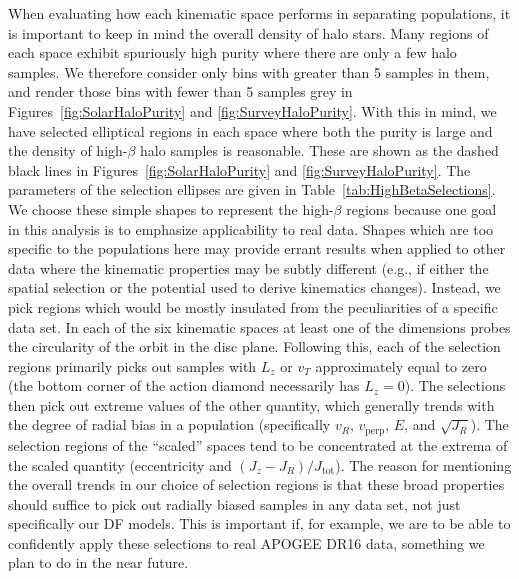 When evaluating how each kinematic space performs in separating populations, it is important to keep in mind the overall density of halo stars. Many regions of each space exhibit spuriously high purity where there are only a few halo samples. We therefore consider only bins with greater than 5 samples in them, and render those bins with fewer than 5 samples grey in Figures~\ref{fig:SolarHaloPurity} and \ref{fig:SurveyHaloPurity}. With this in mind, we have selected elliptical regions in each space where both the purity is large and the density of high-$\beta$ halo samples is reasonable. These are shown as the dashed black lines in Figures~\ref{fig:SolarHaloPurity} and \ref{fig:SurveyHaloPurity}. The parameters of the selection ellipses are given in Table~\ref{tab:HighBetaSelections}. We choose these simple shapes to represent the high-$\beta$ regions because one goal in this analysis is to emphasize applicability to real data. Shapes which are too specific to the populations here may provide errant results when applied to other data where the kinematic properties may be subtly different (e.g., if either the spatial selection or the potential used to derive kinematics changes). Instead, we pick regions which would be mostly insulated from the peculiarities of a specific data set. In each of the six kinematic spaces at least one of the dimensions probes the circularity of the orbit in the disc plane. Following this, each of the selection regions primarily picks out samples with $L_{z}$ or $v_{T}$ approximately equal to zero (the bottom corner of the action diamond necessarily has $L_{z}=0$). The selections then pick out extreme values of the other quantity, which generally trends with the degree of radial bias in a population (specifically $v_{R}$, $v_\mathrm{perp}$, $E$, and $\sqrt{J_{R}}$). The selection regions of the ``scaled'' spaces tend to be concentrated at the extrema of the scaled quantity (eccentricity and $(J_{z}-J_{R})/J_\mathrm{tot}$). The reason for mentioning the overall trends in our choice of selection regions is that these broad properties should suffice to pick out radially biased samples in any data set, not just specifically our DF models. This is important if, for example, we are to be able to confidently apply these selections to real APOGEE DR16 data, something we plan to do in the near future. 

